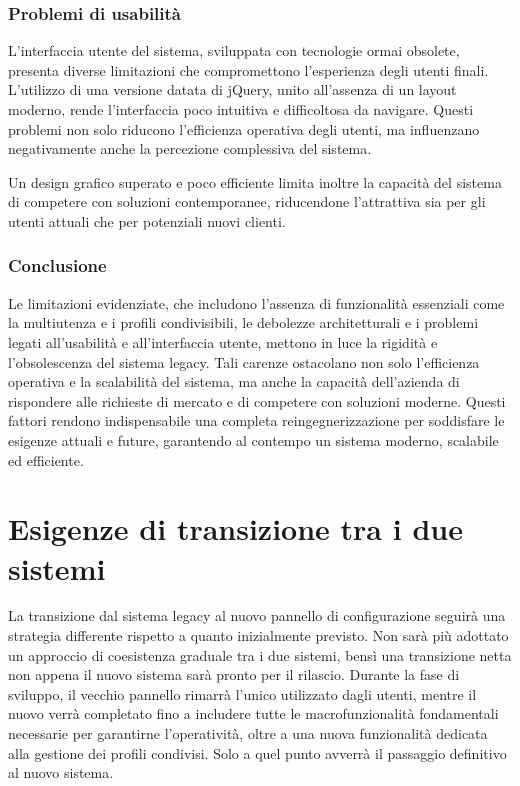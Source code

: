 \subsubsection{Problemi di usabilità}
L'interfaccia utente del sistema, sviluppata con tecnologie ormai obsolete, presenta diverse limitazioni che compromettono l’esperienza degli utenti finali. L’utilizzo di una versione datata di jQuery, unito all’assenza di un layout moderno, rende l’interfaccia poco intuitiva e difficoltosa da navigare. Questi problemi non solo riducono l’efficienza operativa degli utenti, ma influenzano negativamente anche la percezione complessiva del sistema.

Un design grafico superato e poco efficiente limita inoltre la capacità del sistema di competere con soluzioni contemporanee, riducendone l’attrattiva sia per gli utenti attuali che per potenziali nuovi clienti.

\subsubsection{Conclusione}
Le limitazioni evidenziate, che includono l’assenza di funzionalità essenziali come la multiutenza e i profili condivisibili, le debolezze architetturali e i problemi legati all’usabilità e all’interfaccia utente, mettono in luce la rigidità e l'obsolescenza del sistema legacy. Tali carenze ostacolano non solo l'efficienza operativa e la scalabilità del sistema, ma anche la capacità dell'azienda di rispondere alle richieste di mercato e di competere con soluzioni moderne. Questi fattori rendono indispensabile una completa reingegnerizzazione per soddisfare le esigenze attuali e future, garantendo al contempo un sistema moderno, scalabile ed efficiente.

\section{Esigenze di transizione tra i due sistemi}\label{sec:transizione}
La transizione dal sistema legacy al nuovo pannello di configurazione seguirà una strategia differente rispetto a quanto inizialmente previsto. Non sarà più adottato un approccio di coesistenza graduale tra i due sistemi, bensì una transizione netta non appena il nuovo sistema sarà pronto per il rilascio. Durante la fase di sviluppo, il vecchio pannello rimarrà l’unico utilizzato dagli utenti, mentre il nuovo verrà completato fino a includere tutte le macrofunzionalità fondamentali necessarie per garantirne l’operatività, oltre a una nuova funzionalità dedicata alla gestione dei profili condivisi. Solo a quel punto avverrà il passaggio definitivo al nuovo sistema.

